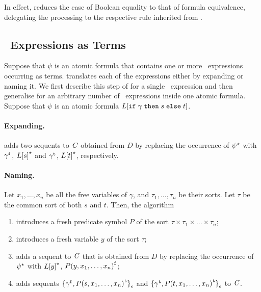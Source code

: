 In effect, \nfcnf{} reduces the case of Boolean equality to that of formula equivalence, 
delegating the processing to the respective rule inherited from \newcnf.


\subsection*{\ITE\ Expressions as Terms}
\label{subsect:term-ite}
Suppose that $\psi$ is an atomic formula that contains one or more \ITE\ expressions occurring as terms. \nfcnf{} translates each of the expressions either by expanding or naming it. 
We first describe this step of \nfcnf{} for a single \ITE\ expression and then generalise for an arbitrary number of \ITE\ expressions inside one atomic formula. Suppose that $\psi$ is an atomic formula $L[\mathtt{if}\;{\gamma}\;\allowbreak\mathtt{then}\;{s}\;\allowbreak\mathtt{else}\;{t}]$.

\paragraph{Expanding.} \nfcnf{} adds two sequents to $\mathit{C}$ obtained from $D$ by replacing the occurrence of ${\psi}^{\star}$ with ${\gamma}^{\mathtt{f}}$, ${L[s]}^{\star}$ and ${\gamma}^{\mathtt{t}}$, ${L[t]}^{\star}$, respectively.
    
\paragraph{Naming.} Let $x_1,\ldots,x_n$ be all the free variables of $\gamma$, and $\tau_1,\ldots,\tau_n$ be their sorts. Let $\tau$ be the common sort of both $s$ and $t$. Then, the \nfcnf{} algorithm 
\begin{enumerate}
  \item introduces a fresh predicate symbol $P$ of the sort $\tau\times\tau_1\times\ldots\times\tau_n$;
  \item introduces a fresh variable $y$ of the sort $\tau$;
  \item adds a sequent to $\mathit{C}$ that is obtained from $D$ by replacing the occurrence of ${\psi}^{\star}$ with ${L[y]}^{\star}$, ${P(y,x_1,\ldots,x_n)}^{\mathtt{f}}$;
  \item adds sequents ${\{{\gamma}^{\mathtt{f}},{P(s,x_1,\ldots,x_n)}^{\mathtt{t}}\}}_{\epsilon}$ and ${\{{\gamma}^{\mathtt{t}},\allowbreak{P(t,\allowbreak x_1,\allowbreak \ldots,x_n)}^{\mathtt{t}}\}}_{\epsilon}$ to $\mathit{C}$.
\end{enumerate}

